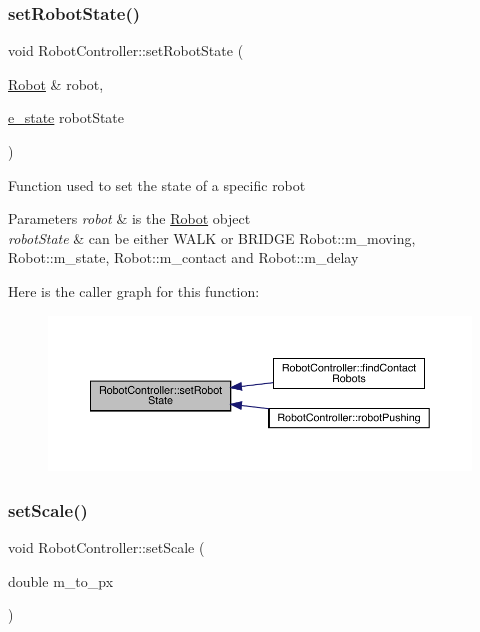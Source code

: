 \subsubsection{\texorpdfstring{set\+Robot\+State()}{setRobotState()}}
{\footnotesize\ttfamily void Robot\+Controller\+::set\+Robot\+State (\begin{DoxyParamCaption}\item[{\mbox{\hyperlink{class_robot}{Robot}} \&}]{robot,  }\item[{\mbox{\hyperlink{_robot_8h_a74a75e4700f1f71bb89d80765319e57b}{e\+\_\+state}}}]{robot\+State }\end{DoxyParamCaption})}

Function used to set the state of a specific robot 
\begin{DoxyParams}{Parameters}
{\em robot} & is the \mbox{\hyperlink{class_robot}{Robot}} object \\
\hline
{\em robot\+State} & can be either W\+A\+LK or B\+R\+I\+D\+GE  Robot\+::m\+\_\+moving, Robot\+::m\+\_\+state, Robot\+::m\+\_\+contact and Robot\+::m\+\_\+delay \\
\hline
\end{DoxyParams}
Here is the caller graph for this function\+:\nopagebreak
\begin{figure}[H]
\begin{center}
\leavevmode
\includegraphics[width=350pt]{class_robot_controller_a797837410a2802b5d7399d132924ba2c_icgraph}
\end{center}
\end{figure}
\mbox{\label{class_robot_controller_a76d6bb1e93bb9523850370fdf76407c4}} 
\subsubsection{\texorpdfstring{set\+Scale()}{setScale()}}
{\footnotesize\ttfamily void Robot\+Controller\+::set\+Scale (\begin{DoxyParamCaption}\item[{double}]{m\+\_\+to\+\_\+px }\end{DoxyParamCaption})}

